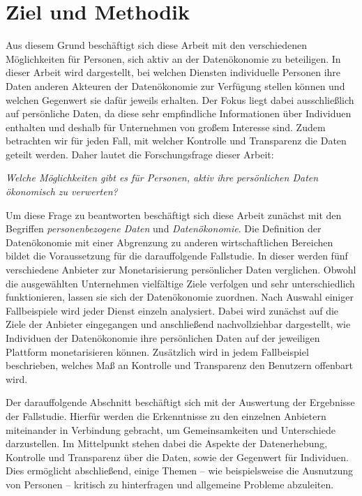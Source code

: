 \section{Ziel und Methodik}
Aus diesem Grund beschäftigt sich diese Arbeit mit den verschiedenen Möglichkeiten für Personen, sich aktiv an der Datenökonomie zu beteiligen. In dieser Arbeit wird dargestellt, bei welchen Diensten individuelle Personen ihre Daten anderen Akteuren der Datenökonomie zur Verfügung stellen können und welchen Gegenwert sie dafür jeweils erhalten. Der Fokus liegt dabei ausschließlich auf persönliche Daten, da diese sehr empfindliche Informationen über Individuen enthalten und deshalb für Unternehmen von großem Interesse sind. Zudem betrachten wir für jeden Fall, mit welcher Kontrolle und Transparenz die Daten geteilt werden. Daher lautet die Forschungsfrage dieser Arbeit:

\begin{center}
\textit{Welche Möglichkeiten gibt es für Personen, aktiv ihre persönlichen Daten ökonomisch zu verwerten?}
\end{center}

\noindent Um diese Frage zu beantworten beschäftigt sich diese Arbeit zunächst mit den Begriffen \textit{personenbezogene Daten} und \textit{Datenökonomie}. Die Definition der Datenökonomie mit einer Abgrenzung zu anderen wirtschaftlichen Bereichen bildet die Voraussetzung für die darauffolgende Fallstudie. In dieser werden fünf verschiedene Anbieter zur Monetarisierung persönlicher Daten verglichen. Obwohl die ausgewählten Unternehmen vielfältige Ziele verfolgen und sehr unterschiedlich funktionieren, lassen sie sich der Datenökonomie zuordnen. Nach Auswahl einiger Fallbeispiele wird jeder Dienst einzeln analysiert. Dabei wird zunächst auf die Ziele der Anbieter eingegangen und anschließend nachvollziehbar dargestellt, wie Individuen der Datenökonomie ihre persönlichen Daten auf der jeweiligen Plattform monetarisieren können. Zusätzlich wird in jedem Fallbeispiel beschrieben, welches Maß an Kontrolle und Transparenz den Benutzern offenbart wird. \newline

\noindent Der darauffolgende Abschnitt beschäftigt sich mit der Auswertung der Ergebnisse der Fallstudie. Hierfür werden die Erkenntnisse zu den einzelnen Anbietern miteinander in Verbindung gebracht, um Gemeinsamkeiten und Unterschiede darzustellen. Im Mittelpunkt stehen dabei die Aspekte der Datenerhebung, Kontrolle und Transparenz über die Daten, sowie der Gegenwert für Individuen. Dies ermöglicht abschließend, einige Themen -- wie beispielsweise die Ausnutzung von Personen -- kritisch zu hinterfragen und allgemeine Probleme abzuleiten.
